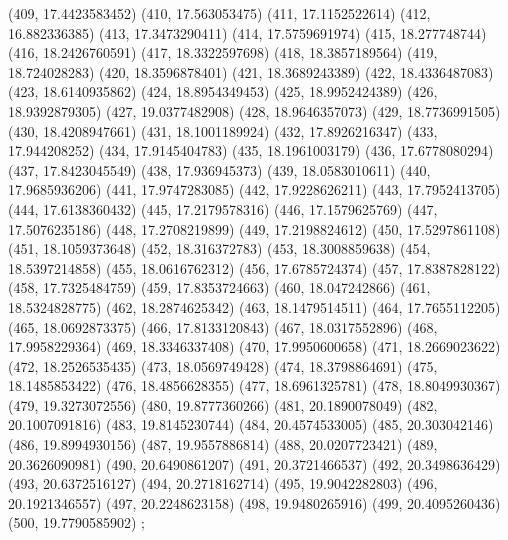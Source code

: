 {					(409, 17.4423583452)
					(410, 17.563053475)
					(411, 17.1152522614)
					(412, 16.882336385)
					(413, 17.3473290411)
					(414, 17.5759691974)
					(415, 18.277748744)
					(416, 18.2426760591)
					(417, 18.3322597698)
					(418, 18.3857189564)
					(419, 18.724028283)
					(420, 18.3596878401)
					(421, 18.3689243389)
					(422, 18.4336487083)
					(423, 18.6140935862)
					(424, 18.8954349453)
					(425, 18.9952424389)
					(426, 18.9392879305)
					(427, 19.0377482908)
					(428, 18.9646357073)
					(429, 18.7736991505)
					(430, 18.4208947661)
					(431, 18.1001189924)
					(432, 17.8926216347)
					(433, 17.944208252)
					(434, 17.9145404783)
					(435, 18.1961003179)
					(436, 17.6778080294)
					(437, 17.8423045549)
					(438, 17.936945373)
					(439, 18.0583010611)
					(440, 17.9685936206)
					(441, 17.9747283085)
					(442, 17.9228626211)
					(443, 17.7952413705)
					(444, 17.6138360432)
					(445, 17.2179578316)
					(446, 17.1579625769)
					(447, 17.5076235186)
					(448, 17.2708219899)
					(449, 17.2198824612)
					(450, 17.5297861108)
					(451, 18.1059373648)
					(452, 18.316372783)
					(453, 18.3008859638)
					(454, 18.5397214858)
					(455, 18.0616762312)
					(456, 17.6785724374)
					(457, 17.8387828122)
					(458, 17.7325484759)
					(459, 17.8353724663)
					(460, 18.047242866)
					(461, 18.5324828775)
					(462, 18.2874625342)
					(463, 18.1479514511)
					(464, 17.7655112205)
					(465, 18.0692873375)
					(466, 17.8133120843)
					(467, 18.0317552896)
					(468, 17.9958229364)
					(469, 18.3346337408)
					(470, 17.9950600658)
					(471, 18.2669023622)
					(472, 18.2526535435)
					(473, 18.0569749428)
					(474, 18.3798864691)
					(475, 18.1485853422)
					(476, 18.4856628355)
					(477, 18.6961325781)
					(478, 18.8049930367)
					(479, 19.3273072556)
					(480, 19.8777360266)
					(481, 20.1890078049)
					(482, 20.1007091816)
					(483, 19.8145230744)
					(484, 20.4574533005)
					(485, 20.303042146)
					(486, 19.8994930156)
					(487, 19.9557886814)
					(488, 20.0207723421)
					(489, 20.3626090981)
					(490, 20.6490861207)
					(491, 20.3721466537)
					(492, 20.3498636429)
					(493, 20.6372516127)
					(494, 20.2718162714)
					(495, 19.9042282803)
					(496, 20.1921346557)
					(497, 20.2248623158)
					(498, 19.9480265916)
					(499, 20.4095260436)
					(500, 19.7790585902)
				};

